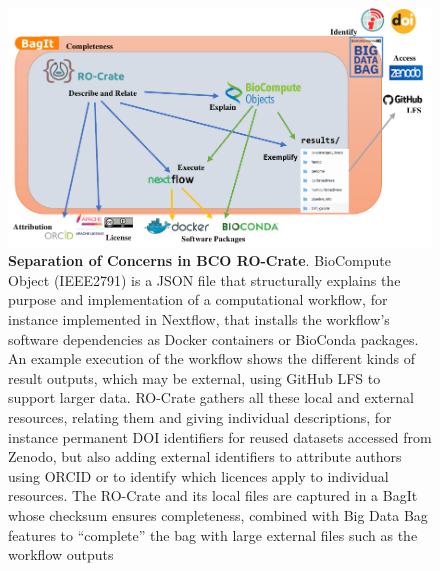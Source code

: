 \begin{figure}[t]
    \centering
    \includegraphics{content/images/ro-crate-bco-sep-of-concerns.pdf}
    \caption{\textbf{Separation of Concerns in BCO RO-Crate}. BioCompute Object (IEEE2791) is a JSON file that structurally explains the purpose and implementation of a computational workflow, for instance implemented in Nextflow, that installs the workflow’s software dependencies as Docker containers or BioConda packages. An example execution of the workflow shows the different kinds of result outputs, which may be external, using GitHub LFS to support larger data. RO-Crate gathers all these local and external resources, relating them and giving individual descriptions, for instance permanent DOI identifiers for reused datasets accessed from Zenodo, but also adding external identifiers to attribute authors using ORCID or to identify which licences apply to individual resources. The RO-Crate and its local files are captured in a BagIt whose checksum ensures completeness, combined with Big Data Bag \cite{doi:10.1109/BigData.2016.7840618} features to “complete” the bag with large external files such as the workflow outputs}
    \label{fig:sep_concerns}
\end{figure}